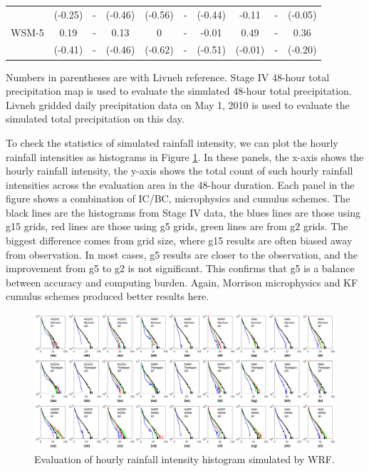 \begin{table}[htbp]
\begin{threeparttable}
\begin{tabular}{cccccccccc}
			& (-0.25) & - & (-0.46) & (-0.56) & - & (-0.44) & -0.11 & - & (-0.05)\\
			WSM-5 & 0.19 & - & 0.13 & 0 & - & -0.01 & 0.49 & - & 0.36\\
			& (-0.41) & - & (-0.46) & (-0.62) & - & (-0.51) & (-0.01) & - & (-0.20)\\
			\hline
		\end{tabular}
		\begin{tablenotes}
			\small
			\item Numbers in parentheses are with Livneh reference. Stage IV 48-hour total precipitation map is used to evaluate the simulated 48-hour total precipitation. Livneh gridded daily precipitation data on May 1, 2010 is used to evaluate the simulated total precipitation on this day.
		\end{tablenotes}
	\end{threeparttable}
	\label{table:2-5}
\end{table}

To check the statistics of simulated rainfall intensity, we can plot the hourly rainfall intensities as histograms in Figure \ref{fig:2-7}. In these panels, the x-axis shows the hourly rainfall intensity, the y-axis shows the total count of such hourly rainfall intensities across the evaluation area in the 48-hour duration. Each panel in the figure shows a combination of IC/BC, microphysics and cumulus schemes. The black lines are the histograms from Stage IV data, the blues lines are those using g15 grids, red lines are those using g5 grids, green lines are from g2 grids. The biggest difference comes from grid size, where g15 results are often biased away from observation. In most cases, g5 results are closer to the observation, and the improvement from g5 to g2 is not significant. This confirms that g5 is a balance between accuracy and computing burden. Again, Morrison microphysics and KF cumulus schemes produced better results here.

\begin{figure}
  \includegraphics[width=\linewidth]{pics/ch2/fig7.jpg}
  \caption{Evaluation of hourly rainfall intensity histogram simulated by WRF.}
  \label{fig:2-7}
\end{figure}

